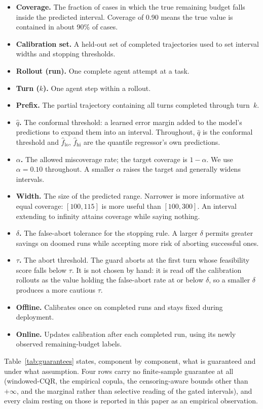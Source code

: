 \documentclass{article}
\begin{document}
\begin{itemize}
\item \textbf{Coverage.} The fraction of cases in which the true remaining budget falls inside the predicted interval. Coverage of 0.90 means the true value is contained in about 90\% of cases.
\item \textbf{Calibration set.} A held-out set of completed trajectories used to set interval widths and stopping thresholds.
\item \textbf{Rollout (run).} One complete agent attempt at a task.
\item \textbf{Turn ($k$).} One agent step within a rollout.
\item \textbf{Prefix.} The partial trajectory containing all turns completed through turn~$k$.
\item \textbf{$\hat{q}$.} The conformal threshold: a learned error margin added to the model's predictions to expand them into an interval. Throughout, $\hat{q}$ is the conformal threshold and $\hat{f}_{\mathrm{lo}}$, $\hat{f}_{\mathrm{hi}}$ are the quantile regressor's own predictions.
\item \textbf{$\alpha$.} The allowed miscoverage rate; the target coverage is $1{-}\alpha$. We use $\alpha{=}0.10$ throughout. A smaller $\alpha$ raises the target and generally widens intervals.
\item \textbf{Width.} The size of the predicted range. Narrower is more informative at equal coverage: $[100,115]$ is more useful than $[100,300]$. An interval extending to infinity attains coverage while saying nothing.
\item \textbf{$\delta$.} The false-abort tolerance for the stopping rule. A larger $\delta$ permits greater savings on doomed runs while accepting more risk of aborting successful ones.
\item \textbf{$\tau$.} The abort threshold. The guard aborts at the first turn whose feasibility score falls below $\tau$. It is not chosen by hand: it is read off the calibration rollouts as the value holding the false-abort rate at or below $\delta$, so a smaller $\delta$ produces a more cautious $\tau$.
\item \textbf{Offline.} Calibrates once on completed runs and stays fixed during deployment.
\item \textbf{Online.} Updates calibration after each completed run, using its newly observed remaining-budget labels.
\end{itemize}

Table~\ref{tab:guarantees} states, component by component, what is guaranteed and under what assumption. Four rows carry no finite-sample guarantee at all (windowed-CQR, the empirical copula, the censoring-aware bounds other than $+\infty$, and the marginal rather than selective reading of the gated intervals), and every claim resting on those is reported in this paper as an empirical observation.
\end{document}
